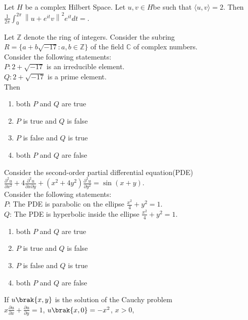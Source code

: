     \item Let $H$ be a complex Hilbert Space. Let $u,v\in H$be such that $\langle u, v \rangle=2$. Then\\ $\displaystyle\frac{1}{2\pi}\int_{0}^{2\pi} \left\| u + e^{it} v \right\|^{2} e^{it} dt =$\underline{\hspace{1.5cm}}.
    \item Let \( \mathbb{Z} \) denote the ring of integers. Consider the subring
$R = \{ a + b\sqrt{-17} : a, b \in \mathbb{Z} \}$ of the field \( \mathbb{C} \) of complex numbers.\\Consider the following statements:\\
$P: 2 + \sqrt{-17}$ is an irreducible element.\\ 
$Q: 2 + \sqrt{-17}$ is a prime element.\\
Then
    \begin{enumerate}
        \item both $P$ and $Q$ are true
        \item $P$ is true and $Q$ is false
        \item $P$ is false and $Q$ is true
        \item both $P$ and $Q$ are false
    \end{enumerate}
    \item Consider the second-order partial differential equation(PDE)\\
    $\displaystyle \frac{\partial^2 u}{\partial x^2} + 4\frac{\partial^2 u}{\partial x \partial y} + (x^2 + 4y^2)\frac{\partial^2 u}{\partial y^2} = \sin(x + y).$\\Consider the following statements:\\$P$: The PDE is parabolic on the ellipse $\frac{x^2}{4} + y^2 = 1.$\\$Q$: The PDE is hyperbolic inside the ellipse $\frac{x^2}{4} + y^2 = 1.$
    \begin{enumerate}
        \item both $P$ and $Q$ are true
        \item $P$ is true and $Q$ is false
        \item $P$ is false and $Q$ is true
        \item both $P$ and $Q$ are false
    \end{enumerate}
    \item If $u\brak{x, y}$ is the solution of the Cauchy problem\\
$\displaystyle x\frac{\partial u}{\partial x} + \frac{\partial u}{\partial y} = 1$, $u\brak{x, 0}=-x^{2}$, $x > 0$,\\
